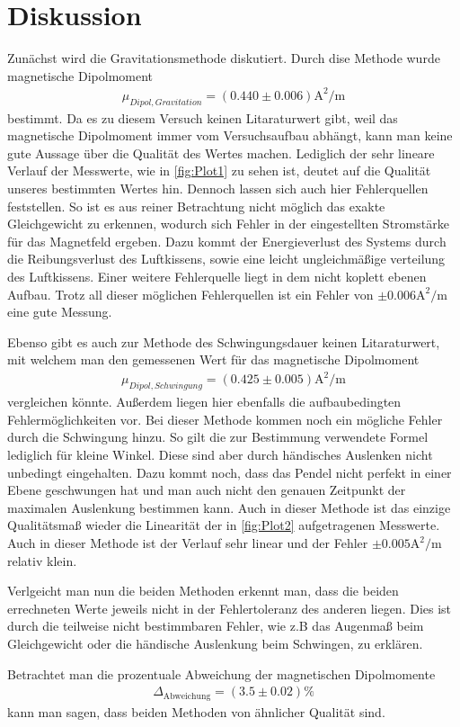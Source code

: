 \section{Diskussion}
\label{sec:Diskussion}
Zunächst wird die Gravitationsmethode diskutiert. Durch dise Methode wurde magnetische Dipolmoment 
\begin{align*}
    \mu_{Dipol, Gravitation} = (0.440 \pm 0.006)\unit{\ampere\squared\per\metre}
\end{align*}
bestimmt. Da es zu diesem Versuch keinen Litaraturwert gibt, weil das magnetische Dipolmoment immer vom Versuchsaufbau abhängt, kann man keine gute Aussage über die Qualität des 
Wertes machen. Lediglich der sehr lineare Verlauf der Messwerte, wie in \autoref{fig:Plot1} zu sehen ist, deutet auf die Qualität unseres bestimmten Wertes hin. 
Dennoch lassen sich auch hier Fehlerquellen feststellen. So ist es aus reiner Betrachtung nicht möglich das exakte Gleichgewicht zu erkennen, wodurch sich Fehler in der 
eingestellten Stromstärke für das Magnetfeld ergeben. Dazu kommt der Energieverlust des Systems durch die Reibungsverlust des Luftkissens, sowie eine leicht ungleichmäßige 
verteilung des Luftkissens. Einer weitere Fehlerquelle liegt in dem nicht koplett ebenen Aufbau. Trotz all dieser möglichen Fehlerquellen ist ein Fehler 
von $\pm 0.006 \unit{\ampere\squared\per\metre}$ eine gute Messung.


Ebenso gibt es auch zur Methode des Schwingungsdauer keinen Litaraturwert, mit welchem man den gemessenen Wert für das magnetische Dipolmoment
\begin{align*} 
    \mu_{Dipol, Schwingung} = (0.425 \pm 0.005)\unit{\ampere\squared\per\metre}
\end{align*}   
vergleichen könnte. Außerdem liegen hier ebenfalls die aufbaubedingten Fehlermöglichkeiten vor. 
Bei dieser Methode kommen noch ein mögliche Fehler durch die Schwingung hinzu. So gilt die zur Bestimmung verwendete Formel lediglich für kleine Winkel. Diese sind aber durch 
händisches Auslenken nicht unbedingt eingehalten. Dazu kommt noch, dass das Pendel nicht perfekt in einer Ebene geschwungen hat und man auch nicht den genauen Zeitpunkt der 
maximalen Auslenkung bestimmen kann. Auch in dieser Methode ist das einzige Qualitätsmaß wieder die Linearität der in \autoref{fig:Plot2} aufgetragenen Messwerte. 
Auch in dieser Methode ist der Verlauf sehr linear und der Fehler $\pm 0.005\unit{\ampere\squared\per\metre}$ relativ klein. 


Verlgeicht man nun die beiden Methoden erkennt man, dass die beiden errechneten Werte jeweils nicht in der Fehlertoleranz des anderen liegen. Dies ist durch die teilweise nicht 
bestimmbaren Fehler, wie z.B das Augenmaß beim Gleichgewicht oder die händische Auslenkung beim Schwingen, zu erklären.


Betrachtet man die prozentuale Abweichung der magnetischen Dipolmomente 
\begin{align*}
    \Delta_{\text{Abweichung}} = (3.5 \pm 0.02)\%
\end{align*}
kann man sagen, dass beiden Methoden von ähnlicher Qualität sind.  